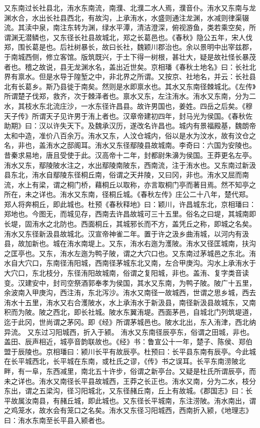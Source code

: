 \documentclass[12pt,UTF8]{ctexbook}
\begin{document}
又东南过长社县北，洧水东南流，南濮、北濮二水人焉，濮音仆。洧水又东南与龙渊水合，水出长社县西北，有故沟，上承洧水，水盛则通注龙渊，水减则律渠辍流。其渎中泉，南注东转为渊，绿水平潭，清洁澄深，俯视游鱼，类若乘空矣，所谓渊无潜鳞也，又东径长社县故城北，郑之长葛邑也。《春秋》隐公五年，宋人伐郑，围长葛是也。后社树暴长，故曰长社，魏颖川郡治也。余以景明中出宰兹郡，于南城西侧，修立客馆。版筑既兴，于土下得一树根，甚壮大，疑是故社怪长暴茂者也。稽之故说，县无龙渊水名，盖出近世矣。京相璠《春秋土地名》曰：长社北界有禀水。但是水导于隍堑之中，非北界之所谓。又按京、社地名，并云：长社县北有长葛乡。斯乃县徙于南矣。然则是水即禀水也。其水又东南径棘城北。《左传》所谓楚子伐郑，救齐，次于棘泽者也。禀水又东，左注洧水。洧水又东南，分为二水，其枝水东北流庄沙，一水东径许昌县。故许男国也，姜姓。四岳之后矣。《穆天子传》所谓天子见许男于洧上者也。汉章帝建初四年，封马光为侯国。《春秋佐助期》曰：汉以许失天下。及魏承汉历，遂改名许昌也。城内有景福殿基，魏朗帝太和中造，准价八百余万。洧水又东，人汶仓城内，俗以是水为汶水，故有汶仓之名，非也，盖洧水之邸阁耳。洧水又东径鄢陵县故城南。李奇曰：六国为安陵也。昔秦求易地，唐且受使于此。汉高帝十二年，封都尉朱濞为侯国。王莽更名左亭。洧水又东，鄢陵陂水注之，水出鄢陵南陂东，西南流，注于洧水也。又东南过新汲县东北，洧水自鄢陵东径桐丘南，俗谓之天井陵，又曰冈，非也。洧水又屈而南流，水上有梁，谓之桐门桥，藉桐丘以取称，亦言取桐门亭而著目焉。然不知亭之所在，未之详也。洧水又东南，径桐丘城。《春秋左传》庄公二十八年，楚代郑。郑人将奔桐丘，即此城也。杜预《春秋释地》曰：颖川，许昌城东北，京相璠曰：郑地也。今图无，而城见存，西南去许昌故城可三十五里。俗名之曰堤，其城南即长堤，固洧水之北防也。西面桐丘，其城邪长而不方，盖凭丘之称，即城之名矣。洧水又东径新汲县故城北。汉宣帝神雀二年。置于许之汲乡曲洧城，以河内有汲县，故加新也。城在洧水南堤上。又东，洧水右迤为濩陂。洧水又径匡城南，扶沟之匡亭也。又东，洧水左迤为鸭子陂，谓之大穴口也。又东南过茅城邑之东北。洧水自大穴口，东南径洧阳城，西南径茅城东北又南，左合甲庚沟。沟水上承洧水于大穴口，东北枝分，东径洧阳故城南，俗谓之复阳城，非也。盖洧、复字类音读变。汉建安中，封司空祭酒郭奉孝为侯国，其水又东南，为鸭子陂。陂广十五里，余波南入甲庚沟，西注洧，东北泻沙。洧水又南径一故城西，世谓之思乡城，西去洧水十五里，洧水又右合濩陂水，水上承洧水于新汲县，南径新汲县故城东，又南积而为陂。陂之西北，即长社城。陂水东翼洧堤。西面茅邑，自城北门列筑堤道，迄于此冈，世尚谓之茅冈。即《经》所谓茅城邑也。陂水北出，东入洧津，西北纳异流。
又东过习阳城西，折入于颍。
洧水又东南径辰亭东，俗谓之田城，非也。盖田、辰声相近，城亭音韵联故也。《经》书：鲁宣公十一年，楚子、陈侯、郑伯盟于辰陵也。京相璠曰：颍川长平有故辰亭。杜预曰：长平县东南有辰亭。今此城在长平城西北，长平城在东南，或杜氏之谬，《传》书之误耳。长平东南涝陂北畔，有一阜，东西减里，南北五十许步，俗谓之新亭台。又疑是杜氏所谓辰亭，而未之详也。洧水又南径长平县故城西，王莽之长正也。洧水又南，分为二水，枝分东出，谓之五梁沟，径习阳城北，又东径赭丘南，丘上有故城。《郡国志》曰：长平故属汝南县，有赭丘城，即此城也。又东径长平城南，东注涝陂。洧水南出，谓之鸡笼水，故水会有笼口之名矣。洧水又东径习阳城西，西南折入颍，《地理志》曰：洧水东南至长平县入颍者也。
\end{document}
